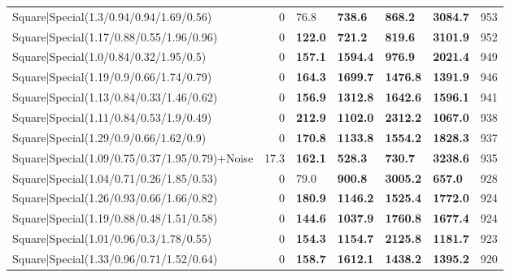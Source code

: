 \begin{tabular}{lrllllr}
 Square|Special(1.3/0.94/0.94/1.69/0.56)                       &             0   & 76.8           & \textbf{738.6}  & \textbf{868.2}  & \textbf{3084.7} &          953 \\
 Square|Special(1.17/0.88/0.55/1.96/0.96)                      &             0   & \textbf{122.0} & \textbf{721.2}  & \textbf{819.6}  & \textbf{3101.9} &          952 \\
 Square|Special(1.0/0.84/0.32/1.95/0.5)                        &             0   & \textbf{157.1} & \textbf{1594.4} & \textbf{976.9}  & \textbf{2021.4} &          949 \\
 Square|Special(1.19/0.9/0.66/1.74/0.79)                       &             0   & \textbf{164.3} & \textbf{1699.7} & \textbf{1476.8} & \textbf{1391.9} &          946 \\
 Square|Special(1.13/0.84/0.33/1.46/0.62)                      &             0   & \textbf{156.9} & \textbf{1312.8} & \textbf{1642.6} & \textbf{1596.1} &          941 \\
 Square|Special(1.11/0.84/0.53/1.9/0.49)                       &             0   & \textbf{212.9} & \textbf{1102.0} & \textbf{2312.2} & \textbf{1067.0} &          938 \\
 Square|Special(1.29/0.9/0.66/1.62/0.9)                        &             0   & \textbf{170.8} & \textbf{1133.8} & \textbf{1554.2} & \textbf{1828.3} &          937 \\
 Square|Special(1.09/0.75/0.37/1.95/0.79)+Noise                &            17.3 & \textbf{162.1} & \textbf{528.3}  & \textbf{730.7}  & \textbf{3238.6} &          935 \\
 Square|Special(1.04/0.71/0.26/1.85/0.53)                      &             0   & 79.0           & \textbf{900.8}  & \textbf{3005.2} & \textbf{657.0}  &          928 \\
 Square|Special(1.26/0.93/0.66/1.66/0.82)                      &             0   & \textbf{180.9} & \textbf{1146.2} & \textbf{1525.4} & \textbf{1772.0} &          924 \\
 Square|Special(1.19/0.88/0.48/1.51/0.58)                      &             0   & \textbf{144.6} & \textbf{1037.9} & \textbf{1760.8} & \textbf{1677.4} &          924 \\
 Square|Special(1.01/0.96/0.3/1.78/0.55)                       &             0   & \textbf{154.3} & \textbf{1154.7} & \textbf{2125.8} & \textbf{1181.7} &          923 \\
 Square|Special(1.33/0.96/0.71/1.52/0.64)                      &             0   & \textbf{158.7} & \textbf{1612.1} & \textbf{1438.2} & \textbf{1395.2} &          920 \\

\end{tabular}

